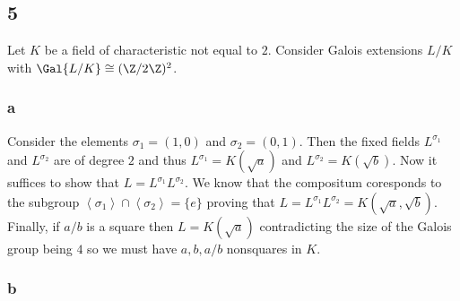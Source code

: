 \documentclass[12pt]{article}
\begin{document}
\subsection{5}

Let $K$ be a field of characteristic not equal to $2$. Consider Galois extensions $L/K$ with $\Gal{L/K} \cong (\Z/2\Z)^2$.

\subsubsection{a}

Consider the elements $\sigma_1 = (1,0)$ and $\sigma_2 = (0,1)$. Then the fixed fields $L^{\sigma_1}$ and $L^{\sigma_2}$ are of degree $2$ and thus $L^{\sigma_1} = K(\sqrt{a})$ and $L^{\sigma_2} = K(\sqrt{b})$. Now it suffices to show that $L = L^{\sigma_1} L^{\sigma_2}$. We know that the compositum coresponds to the subgroup $\left< \sigma_1 \right> \cap \left< \sigma_2 \right> = \{ e \}$ proving that $L = L^{\sigma_1} L^{\sigma_2} = K(\sqrt{a}, \sqrt{b})$. Finally, if $a/b$ is a square then $L = K(\sqrt{a})$ contradicting the size of the Galois group being $4$ so we must have $a,b, a/b$ nonsquares in $K$.

\subsubsection{b}
\end{document}
